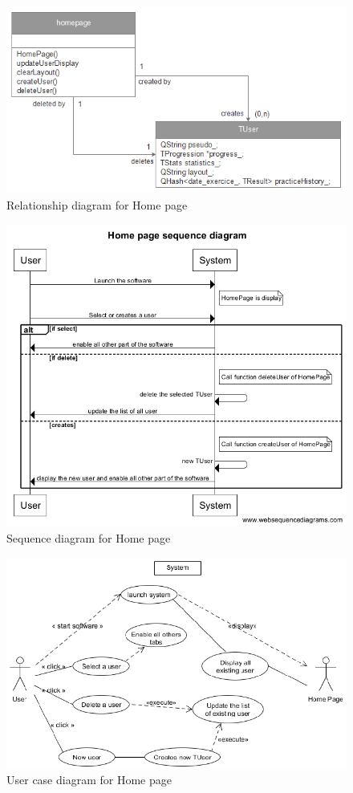 \begin{figure}[H]
	\centering
	\includegraphics[width=12cm]{diagrams/Rhomepage.png}
	\caption{Relationship diagram for Home page}
	\label{Rhomepage} 
\end{figure}
\begin{figure}[H]
	\centering
	\includegraphics[width=12cm]{diagrams/Shomepage.png}
	\caption{Sequence diagram for Home page}
	\label{Shomepage}
\end{figure}
\begin{figure}[H]
	\centering
	\includegraphics[width=12cm]{diagrams/UChomepage.png}
	\caption{User case diagram for Home page}
	\label{UChomepage}
\end{figure}

